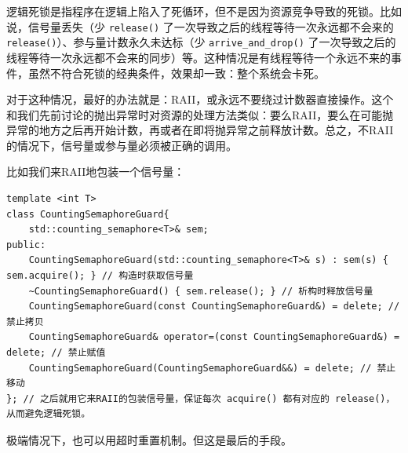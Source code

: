 逻辑死锁是指程序在逻辑上陷入了死循环，但不是因为资源竞争导致的死锁。比如说，信号量丢失（少 \verb|release()| 了一次导致之后的线程等待一次永远都不会来的 \verb|release()|）、参与量计数永久未达标（少 \verb|arrive_and_drop()| 了一次导致之后的线程等待一次永远都不会来的同步）等。这种情况是有线程等待一个永远不来的事件，虽然不符合死锁的经典条件，效果却一致：整个系统会卡死。

对于这种情况，最好的办法就是：RAII，或永远不要绕过计数器直接操作。这个和我们先前讨论的抛出异常时对资源的处理方法类似：要么RAII，要么在可能抛异常的地方之后再开始计数，再或者在即将抛异常之前释放计数。总之，不RAII的情况下，信号量或参与量必须被正确的调用。

比如我们来RAII地包装一个信号量：
\begin{verbatim}
template <int T>
class CountingSemaphoreGuard{
    std::counting_semaphore<T>& sem;
public:
    CountingSemaphoreGuard(std::counting_semaphore<T>& s) : sem(s) { sem.acquire(); } // 构造时获取信号量
    ~CountingSemaphoreGuard() { sem.release(); } // 析构时释放信号量
    CountingSemaphoreGuard(const CountingSemaphoreGuard&) = delete; // 禁止拷贝
    CountingSemaphoreGuard& operator=(const CountingSemaphoreGuard&) = delete; // 禁止赋值
    CountingSemaphoreGuard(CountingSemaphoreGuard&&) = delete; // 禁止移动
}; // 之后就用它来RAII的包装信号量，保证每次 acquire() 都有对应的 release()，从而避免逻辑死锁。
\end{verbatim}
极端情况下，也可以用超时重置机制。但这是最后的手段。